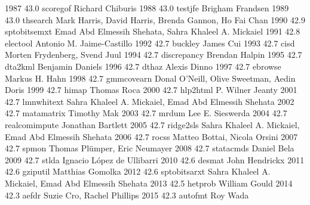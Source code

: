   1987     43.0    scoregof      Richard Chiburis                        
  1988     43.0    testjfe       Brigham Frandsen                        
  1989     43.0    thsearch      Mark Harris, David Harris, Brenda       
                                   Gannon, Ho Fai Chan                     
  1990     42.9    sptobitsemxt  Emad Abd Elmessih Shehata, Sahra        
                                   Khaleel A. Mickaiel                     
  1991     42.8    electool      Antonio M. Jaime-Castillo               
  1992     42.7    buckley       James Cui                               
  1993     42.7    cisd          Morten Frydenberg, Svend Juul           
  1994     42.7    discrepancy   Brendan Halpin                          
  1995     42.7    dta2kml       Benjamin Daniels                        
  1996     42.7    dthaz         Alexis Dinno                            
  1997     42.7    ebrowse       Markus H. Hahn                          
  1998     42.7    gmmcovearn    Donal O'Neill, Olive Sweetman, Aedin    
                                   Doris                                   
  1999     42.7    himap         Thomas Roca                             
  2000     42.7    hlp2html      P. Wilner Jeanty                        
  2001     42.7    lmnwhitext    Sahra Khaleel A. Mickaiel, Emad Abd     
                                   Elmessih Shehata                        
  2002     42.7    matamatrix    Timothy Mak                             
  2003     42.7    mrdum         Lee E. Sieswerda                        
  2004     42.7    realcomimpute  Jonathan Bartlett                       
  2005     42.7    ridge2sls     Sahra Khaleel A. Mickaiel, Emad Abd     
                                   Elmessih Shehata                        
  2006     42.7    rocss         Matteo Bottai, Nicola Orsini            
  2007     42.7    spmon         Thomas Plümper, Eric Neumayer          
  2008     42.7    statacmds     Daniel Bela                             
  2009     42.7    stlda         Ignacio López de Ullibarri             
  2010     42.6    desmat        John Hendrickx                          
  2011     42.6    gziputil      Matthias Gomolka                        
  2012     42.6    sptobitsarxt  Sahra Khaleel A. Mickaiel, Emad Abd     
                                   Elmessih Shehata                        
  2013     42.5    hetprob       William Gould                           
  2014     42.3    aefdr         Suzie Cro, Rachel Phillips              
  2015     42.3    autofmt       Roy Wada                                
